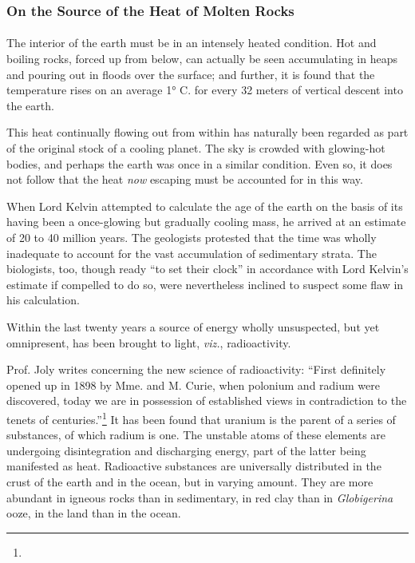 \documentclass[a4paper, 12pt, oneside]{article}
\begin{document}
\subsubsection{On the Source of the Heat of Molten Rocks}
\paragraph{}
The interior of the earth must be in an intensely heated condition. Hot and boiling rocks, forced up from below, can actually be seen accumulating in heaps and pouring out in floods over the surface; and further, it is found that the temperature rises on an average 1° C. for every 32 meters of vertical descent into the earth.

This heat continually flowing out from within has naturally been regarded as part of the original stock of a cooling planet. The sky is crowded with glowing-hot bodies, and perhaps the earth was once in a similar condition. Even so, it does not follow that the heat \emph{now} escaping must be accounted for in this way.

When Lord Kelvin attempted to calculate the age of the earth on the basis of its having been a once-glowing but gradually cooling mass, he arrived at an estimate of 20 to 40 million years. The geologists protested that the time was wholly inadequate to account for the vast accumulation of sedimentary strata. The biologists, too, though ready ``to set their clock'' in accordance with Lord Kelvin's estimate if compelled to do so, were nevertheless inclined to suspect some flaw in his calculation.

Within the last twenty years a source of energy wholly unsuspected, but yet omnipresent, has been brought to light, \emph{viz.}, radioactivity.

Prof. Joly writes concerning the new science of radioactivity: ``First definitely opened up in 1898 by Mme. and M. Curie, when polonium and radium were discovered, today we are in possession of established views in contradiction to the tenets of centuries.''\footnote{} It has been found that uranium is the parent of a series of substances, of which radium is one. The unstable atoms of these elements are undergoing disintegration and discharging energy, part of the latter being manifested as heat. Radioactive substances are universally distributed in the crust of the earth and in the ocean, but in varying amount. They are more abundant in igneous rocks than in sedimentary, in red clay than in \emph{Globigerina} ooze, in the land than in the ocean.
\end{document}
